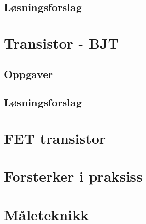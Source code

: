 \documentclass[12pt]{report}
\begin{document}
\subsection{Løsningsforslag}
\printsolutions[section]

\newpage

\section{Transistor - BJT}
\label{sec:tranBJT}

\subsection{Oppgaver}

\subsection{Løsningsforslag}
\printsolutions[section]

\newpage



\section{FET transistor}

\section{Forsterker i praksiss}

\section{Måleteknikk}

\newpage

\printbibliography%

\appendix

\end{document}
